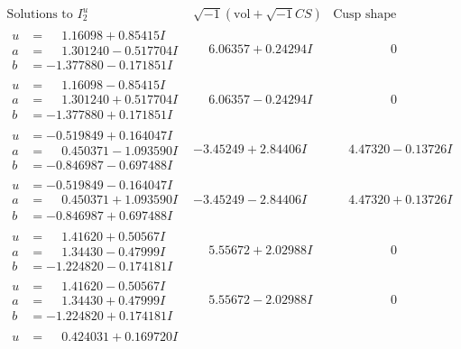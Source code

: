 \documentclass[1p]{elsarticle_modified}
\theoremstyle{definition}
\newcommand{\I}{\sqrt{-1}}
\begin{document}
$$\begin{array}{c|c|c}
\text{Solutions to }I^u_{2}& \I (\text{vol} + \sqrt{-1}CS) & \text{Cusp shape}\\
 \hline 
\begin{aligned}
u &= \phantom{-}1.16098 + 0.85415 I \\
a &= \phantom{-}1.301240 - 0.517704 I \\
b &= -1.377880 - 0.171851 I\end{aligned}
 & \phantom{-}6.06357 + 0.24294 I & \phantom{-0.000000 } 0 \\ \hline\begin{aligned}
u &= \phantom{-}1.16098 - 0.85415 I \\
a &= \phantom{-}1.301240 + 0.517704 I \\
b &= -1.377880 + 0.171851 I\end{aligned}
 & \phantom{-}6.06357 - 0.24294 I & \phantom{-0.000000 } 0 \\ \hline\begin{aligned}
u &= -0.519849 + 0.164047 I \\
a &= \phantom{-}0.450371 - 1.093590 I \\
b &= -0.846987 - 0.697488 I\end{aligned}
 & -3.45249 + 2.84406 I & \phantom{-}4.47320 - 0.13726 I \\ \hline\begin{aligned}
u &= -0.519849 - 0.164047 I \\
a &= \phantom{-}0.450371 + 1.093590 I \\
b &= -0.846987 + 0.697488 I\end{aligned}
 & -3.45249 - 2.84406 I & \phantom{-}4.47320 + 0.13726 I \\ \hline\begin{aligned}
u &= \phantom{-}1.41620 + 0.50567 I \\
a &= \phantom{-}1.34430 - 0.47999 I \\
b &= -1.224820 - 0.174181 I\end{aligned}
 & \phantom{-}5.55672 + 2.02988 I & \phantom{-0.000000 } 0 \\ \hline\begin{aligned}
u &= \phantom{-}1.41620 - 0.50567 I \\
a &= \phantom{-}1.34430 + 0.47999 I \\
b &= -1.224820 + 0.174181 I\end{aligned}
 & \phantom{-}5.55672 - 2.02988 I & \phantom{-0.000000 } 0 \\ \hline\begin{aligned}
u &= \phantom{-}0.424031 + 0.169720 I \\

\end{aligned}
\end{array}$$
\end{document}
